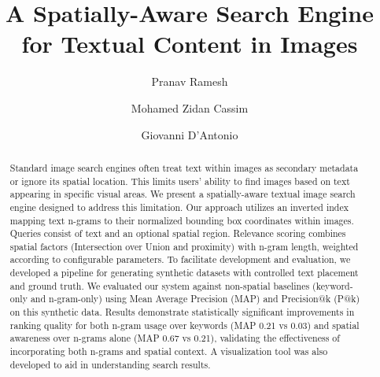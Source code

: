 \documentclass[manuscript,screen]{acmart}
\begin{document}
\title{A Spatially-Aware Search Engine for Textual Content in Images}

\author{Pranav Ramesh}

\author{Mohamed Zidan Cassim}

\author{Giovanni D'Antonio}

\renewcommand{\shortauthors}{Ramesh et al.}

\begin{abstract}
    Standard image search engines often treat text within images as secondary metadata or ignore its spatial location. This limits users' ability to find images based on text appearing in specific visual areas. We present a spatially-aware textual image search engine designed to address this limitation. Our approach utilizes an inverted index mapping text n-grams to their normalized bounding box coordinates within images. Queries consist of text and an optional spatial region. Relevance scoring combines spatial factors (Intersection over Union and proximity) with n-gram length, weighted according to configurable parameters. To facilitate development and evaluation, we developed a pipeline for generating synthetic datasets with controlled text placement and ground truth. We evaluated our system against non-spatial baselines (keyword-only and n-gram-only) using Mean Average Precision (MAP) and Precision@k (P@k) on this synthetic data. Results demonstrate statistically significant improvements in ranking quality for both n-gram usage over keywords (MAP 0.21 vs 0.03) and spatial awareness over n-grams alone (MAP 0.67 vs 0.21), validating the effectiveness of incorporating both n-grams and spatial context. A visualization tool was also developed to aid in understanding search results.
\end{abstract}
\end{document}
